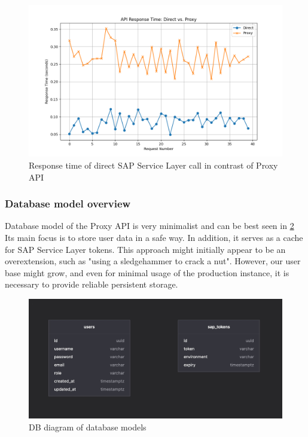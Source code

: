 \begin{figure}[p]\centering
\includegraphics[width=140mm]{img/chap07/fig_api_response_direct_response_time.png}
\caption{Response time of direct SAP Service Layer call in contrast of Proxy API}
\label{img07:response_times}
\end{figure}

\subsubsection{Database model overview}
Database model of the Proxy API is very minimalist and can be best seen in \ref{img07:db_diagram}
Its main focus is to store user data in a safe way. 
In addition, it serves as a cache for SAP Service Layer tokens. 
This approach might initially appear to be an overextension, such as "using a sledgehammer to crack a nut". 
However, our user base might grow, and even for minimal usage of the production instance, it is necessary to provide reliable persistent storage.

\begin{figure}[p]\centering
\includegraphics[width=140mm]{img/chap07/fig_db-diagram.jpg}
\caption{DB diagram of database models}
\label{img07:db_diagram}
\end{figure}



